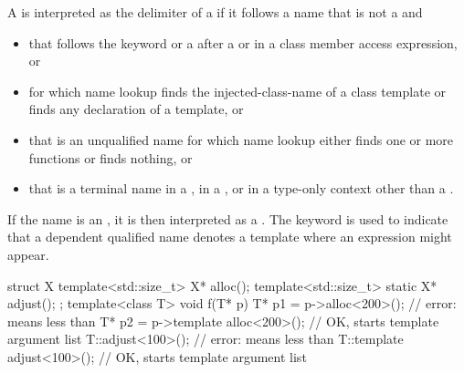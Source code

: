 \pnum
A \tcode{<} is interpreted as the delimiter of
a 
if it follows a name that is not a  and
\begin{itemize}
\item
that follows the keyword  or a \tcode{\~}
after a  or
in a class member access expression, or
\item
for which name lookup finds the injected-class-name of a class template or
finds any declaration of a template, or
\item
that is an unqualified name
for which name lookup either finds one or more functions or finds nothing, or
\item
that is a terminal name
in a ,
in a , or
in a type-only context
other than a .
\end{itemize}
\begin{note}
If the name is an ,
it is then interpreted as a .
The keyword  is used to indicate
that a dependent qualified name denotes a template
where an expression might appear.
\end{note}
\begin{example}
\begin{codeblock}
struct X {
  template<std::size_t> X* alloc();
  template<std::size_t> static X* adjust();
};
template<class T> void f(T* p) {
  T* p1 = p->alloc<200>();              // error: \tcode{<} means less than
  T* p2 = p->template alloc<200>();     // OK, \tcode{<} starts template argument list
  T::adjust<100>();                     // error: \tcode{<} means less than
  T::template adjust<100>();            // OK, \tcode{<} starts template argument list
}
\end{codeblock}
\end{example}

